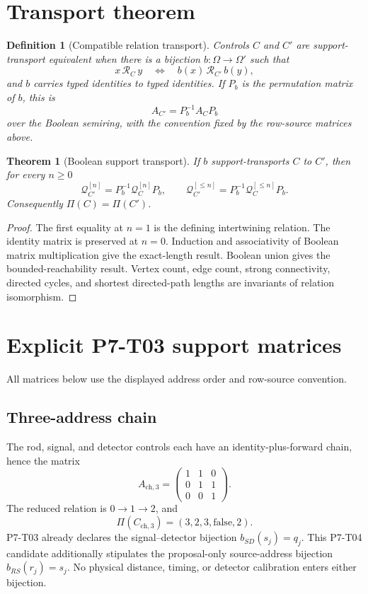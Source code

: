 \documentclass[11pt]{article}
\newtheorem{definition}{Definition}
\newtheorem{theorem}{Theorem}
\newcommand{\Rel}{\mathcal R}
\newcommand{\Reach}{\mathcal Q}
\begin{document}
\section{Transport theorem}

\begin{definition}[Compatible relation transport]
Controls \(C\) and \(C'\) are support-transport equivalent when there is a
bijection \(b:\Omega\to\Omega'\) such that
\[
  x\,\Rel_C\,y
  \quad\Longleftrightarrow\quad
  b(x)\,\Rel_{C'}\,b(y),
\]
and \(b\) carries typed identities to typed identities.  If \(P_b\) is the
permutation matrix of \(b\), this is
\[
  A_{C'}=P_b^{-1}A_CP_b
\]
over the Boolean semiring, with the convention fixed by the row-source
matrices above.
\end{definition}

\begin{theorem}[Boolean support transport]
\label{thm:transport}
If \(b\) support-transports \(C\) to \(C'\), then for every \(n\geq0\)
\[
  \Reach_{C'}^{[n]}
  =P_b^{-1}\Reach_C^{[n]}P_b,
  \qquad
  \Reach_{C'}^{[\le n]}
  =P_b^{-1}\Reach_C^{[\le n]}P_b.
\]
Consequently \(\Pi(C)=\Pi(C')\).
\end{theorem}

\begin{proof}
The first equality at \(n=1\) is the defining intertwining relation.  The
identity matrix is preserved at \(n=0\).  Induction and associativity of
Boolean matrix multiplication give the exact-length result.  Boolean union
gives the bounded-reachability result.  Vertex count, edge count, strong
connectivity, directed cycles, and shortest directed-path lengths are
invariants of relation isomorphism.
\end{proof}

\section{Explicit P7-T03 support matrices}

All matrices below use the displayed address order and row-source
convention.

\subsection{Three-address chain}

The rod, signal, and detector controls each have an identity-plus-forward
chain, hence the matrix
\[
 A_{\mathrm{ch},3}=
 \begin{pmatrix}
 1&1&0\\
 0&1&1\\
 0&0&1
 \end{pmatrix}.
\]
The reduced relation is \(0\to1\to2\), and
\[
 \Pi(C_{\mathrm{ch},3})=(3,2,3,\mathrm{false},2).
\]
P7-T03 already declares the signal--detector bijection
\(b_{SD}(s_j)=q_j\).  This P7-T04 candidate additionally stipulates the
proposal-only source-address bijection \(b_{RS}(r_j)=s_j\).  No physical
distance, timing, or detector calibration enters either bijection.
\end{document}
